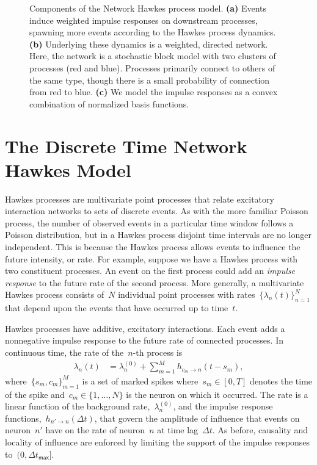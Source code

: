 \begin{figure}[t]
\begin{center}
\begin{subfigure}[b]{2.10in}
      \label{fig:hawkes_c}
    \end{subfigure}
  \end{center}
  \caption[Components of the discrete time Hawkes process model]{
    Components of the Network Hawkes process model.
    \textbf{(a)} Events induce weighted impulse responses on downstream processes, spawning more events according to the Hawkes process dynamics.
    \textbf{(b)} Underlying these dynamics is a weighted, directed network. Here, the network is a stochastic block model with two clusters of processes (red and blue). Processes primarily connect to others of the same type, though there is a small probability of connection from red to blue.
    \textbf{(c)} We model the impulse responses as a convex combination of normalized basis functions.}
\label{fig:discrete_hawkes}
\end{figure}

\section{The Discrete Time Network Hawkes Model}
Hawkes processes \cite{Hawkes-1971} are multivariate point processes
that relate excitatory interaction networks to sets of discrete
events.  As with the more familiar Poisson process, the number of
observed events in a particular time window follows a Poisson
distribution, but in a Hawkes process disjoint time intervals are no
longer independent.  This is because the Hawkes process allows events
to influence the future intensity, or rate.  For example, suppose we
have a Hawkes process with two constituent processes.  An event on the
first process could add an \emph{impulse response} to the future rate
of the second process.  More generally, a multivariate Hawkes process
consists of~$N$ individual point processes with
rates~${\{\lambda_n(t)\}_{n=1}^N}$ that depend upon the events that
have occurred up to time~$t$.

Hawkes processes have additive, excitatory interactions.  Each event
adds a nonnegative impulse response to the future rate of connected
processes.  In continuous time, the rate of the~$n$-th process is
\begin{align}
\label{eq:cont_hawkes_rate}
 \lambda_{n}(t) &= \lambda_n^{(0)} + \sum_{m=1}^{M} h_{c_{m} \to n}(t-s_{m}),
\end{align}
where~${\{s_m, c_m\}_{m=1}^{M}}$ is a set of marked spikes where~$s_m
\in [0,T]$ denotes the time of the spike and~${c_m \in \{1, \ldots
  ,N\}}$ is the neuron on which it occurred. The rate is a linear
function of the background rate,~$\lambda_n^{(0)}$, and the impulse
response functions,~${h_{n' \to n}(\Delta t)}$, that govern the
amplitude of influence that events on neuron~$n'$ have on the rate of
neuron~$n$ at time lag~${\Delta t}$. As before, causality and locality
of influence are enforced by limiting the support of the impulse responses
to~$(0, \Delta t_{\mathsf{max}}]$.


